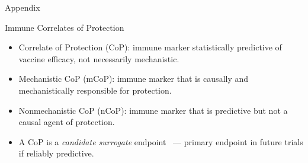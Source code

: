 \documentclass{beamer}
\begin{document}

\appendix
\begin{frame}[standout]
  Appendix
\end{frame}


\begin{frame}[c]{Immune Correlates of Protection~\citep{plotkin2012nomenclature}}

\begin{center}
\begin{itemize}
  \itemsep8pt
  \item Correlate of Protection (CoP): immune marker statistically predictive
    of vaccine efficacy, not necessarily mechanistic.
  \item Mechanistic CoP (mCoP): immune marker that is causally and
    mechanistically responsible for protection.
  \item Nonmechanistic CoP (nCoP): immune marker that is predictive but not a
    causal agent of protection.
  \item A CoP is a \textit{candidate surrogate}
      endpoint~\citep{prentice1989surrogate} --- primary
      endpoint in future trials if reliably predictive.
\end{itemize}
\end{center}

\note{
}

\end{frame}

\end{document}
